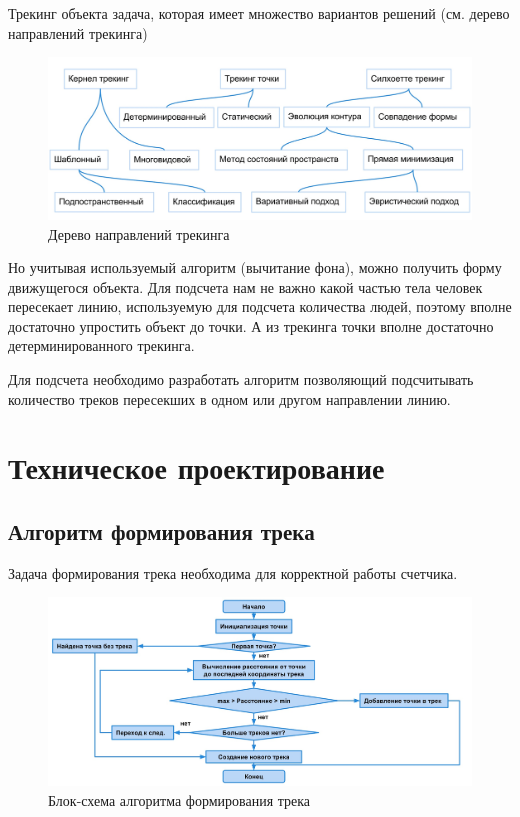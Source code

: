 \documentclass[12pt]{article}
\begin{document}
Трекинг объекта задача, которая имеет множество вариантов решений (см. дерево направлений трекинга)

		\begin{figure}[h!]
			\centering
			\includegraphics[width=1\textwidth]{pic/tracking_tree.jpg}
			\caption{Дерево направлений трекинга}
		\end{figure}	
Но учитывая используемый алгоритм (вычитание фона), можно получить форму движущегося объекта. Для подсчета нам не важно какой частью тела человек пересекает линию, используемую для подсчета количества людей, поэтому вполне достаточно упростить объект до точки. А из трекинга точки вполне достаточно детерминированного трекинга. 

Для подсчета необходимо разработать алгоритм позволяющий подсчитывать количество треков пересекших в одном или другом направлении линию. 

	\section{Техническое проектирование}
		\subsection{Алгоритм формирования трека}
Задача формирования трека необходима для корректной работы счетчика. 

		\begin{figure}[h!]
			\centering
			\includegraphics[width=1\textwidth]{pic/new_track_form.jpg}
			\caption{Блок-схема алгоритма формирования трека}
		\end{figure}	
\end{document}
